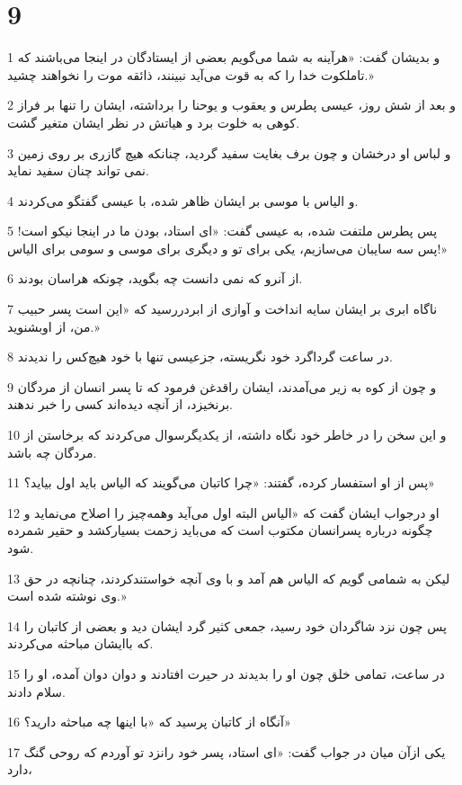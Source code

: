 \chapter{9}

\par 1 و بدیشان گفت: «هرآینه به شما می‌گویم بعضی از ایستادگان در اینجا می‌باشند که تاملکوت خدا را که به قوت می‌آید نبینند، ذائقه موت را نخواهند چشید.»
\par 2 و بعد از شش روز، عیسی پطرس و یعقوب و یوحنا را برداشته، ایشان را تنها بر فراز کوهی به خلوت برد و هیاتش در نظر ایشان متغیر گشت.
\par 3 و لباس او درخشان و چون برف بغایت سفید گردید، چنانکه هیچ گازری بر روی زمین نمی تواند چنان سفید نماید.
\par 4 و الیاس با موسی بر ایشان ظاهر شده، با عیسی گفتگو می‌کردند.
\par 5 پس پطرس ملتفت شده، به عیسی گفت: «ای استاد، بودن ما در اینجا نیکو است! پس سه سایبان می‌سازیم، یکی برای تو و دیگری برای موسی و سومی برای الیاس!»
\par 6 از آنرو که نمی دانست چه بگوید، چونکه هراسان بودند.
\par 7 ناگاه ابری بر ایشان سایه انداخت و آوازی از ابردر‌رسید که «این است پسر حبیب من، از اوبشنوید.»
\par 8 در ساعت گرداگرد خود نگریسته، جزعیسی تنها با خود هیچ‌کس را ندیدند.
\par 9 و چون از کوه به زیر می‌آمدند، ایشان راقدغن فرمود که تا پسر انسان از مردگان برنخیزد، از آنچه دیده‌اند کسی را خبر ندهند.
\par 10 و این سخن را در خاطر خود نگاه داشته، از یکدیگرسوال می‌کردند که برخاستن از مردگان چه باشد.
\par 11 پس از او استفسار کرده، گفتند: «چرا کاتبان می‌گویند که الیاس باید اول بیاید؟»
\par 12 او درجواب ایشان گفت که «الیاس البته اول می‌آید وهمه‌چیز را اصلاح می‌نماید و چگونه درباره پسرانسان مکتوب است که می‌باید زحمت بسیارکشد و حقیر شمرده شود.
\par 13 لیکن به شمامی گویم که الیاس هم آمد و با وی آنچه خواستندکردند، چنانچه در حق وی نوشته شده است.»
\par 14 پس چون نزد شاگردان خود رسید، جمعی کثیر گرد ایشان دید و بعضی از کاتبان را که باایشان مباحثه می‌کردند.
\par 15 در ساعت، تمامی خلق چون او را بدیدند در حیرت افتادند و دوان دوان آمده، او را سلام دادند.
\par 16 آنگاه از کاتبان پرسید که «با اینها چه مباحثه دارید؟»
\par 17 یکی ازآن میان در جواب گفت: «ای استاد، پسر خود رانزد تو آوردم که روحی گنگ دارد،
